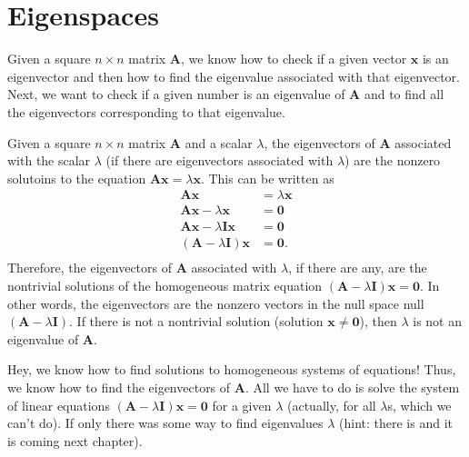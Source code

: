 \documentclass[
]{book}
\theoremstyle{definition}
\theoremstyle{definition}
\theoremstyle{definition}
\theoremstyle{definition}
\theoremstyle{remark}
\begin{document}
\hypertarget{eigenspaces}{%
\section{Eigenspaces}\label{eigenspaces}}

Given a square \(n \times n\) matrix \(\mathbf{A}\), we know how to check if a given vector \(\mathbf{x}\) is an eigenvector and then how to find the eigenvalue associated with that eigenvector. Next, we want to check if a given number is an eigenvalue of \(\mathbf{A}\) and to find all the eigenvectors corresponding to that eigenvalue.

Given a square \(n \times n\) matrix \(\mathbf{A}\) and a scalar \(\lambda\), the eigenvectors of \(\mathbf{A}\) associated with the scalar \(\lambda\) (if there are eigenvectors associated with \(\lambda\)) are the nonzero solutoins to the equation \(\mathbf{A} \mathbf{x} = \lambda \mathbf{x}\). This can be written as
\[
\begin{aligned}
\mathbf{A} \mathbf{x} & = \lambda \mathbf{x} \\
\mathbf{A} \mathbf{x} -\lambda \mathbf{x} & = \mathbf{0} \\
\mathbf{A} \mathbf{x} -\lambda \mathbf{I} \mathbf{x} & = \mathbf{0} \\
\left( \mathbf{A} -\lambda \mathbf{I} \right) \mathbf{x} & = \mathbf{0}. \\
\end{aligned}
\]
Therefore, the eigenvectors of \(\mathbf{A}\) associated with \(\lambda\), if there are any, are the nontrivial solutions of the homogeneous matrix equation \(\left( \mathbf{A} - \lambda \mathbf{I} \right) \mathbf{x} = \mathbf{0}\). In other words, the eigenvectors are the nonzero vectors in the null space null\(\left( \mathbf{A} -\lambda \mathbf{I} \right)\). If there is not a nontrivial solution (solution \(\mathbf{x} \neq \mathbf{0}\)), then \(\lambda\) is not an eigenvalue of \(\mathbf{A}\).

Hey, we know how to find solutions to homogeneous systems of equations! Thus, we know how to find the eigenvectors of \(\mathbf{A}\). All we have to do is solve the system of linear equations \(\left( \mathbf{A} -\lambda \mathbf{I} \right) \mathbf{x} = \mathbf{0}\) for a given \(\lambda\) (actually, for all \(\lambda\)s, which we can't do). If only there was some way to find eigenvalues \(\lambda\) (hint: there is and it is coming next chapter).
\end{document}
